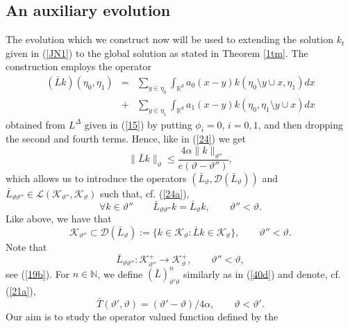 \documentclass[reqno,11pt]{amsart}
\theoremstyle{definition}
\theoremstyle{remark}
\numberwithin{equation}{section}
\begin{document}
\subsection{An auxiliary evolution}

The evolution which we construct now  will be used to extending the
solution $k_t$ given in (\ref{JN1}) to the global solution as stated
in Theorem \ref{1tm}. The construction employs the operator
\begin{eqnarray}
  \label{55}
(\bar{L} k) (\eta_0, \eta_1) & = & \sum_{y\in \eta_0}
\int_{\mathds{R}^d} a_0 (x-y) k(\eta_0 \setminus y \cup x, \eta_1) d
x \\[.2cm] & + & \sum_{y\in \eta_1}
\int_{\mathds{R}^d} a_1 (x-y) k(\eta_0, \eta_1 \setminus y \cup x) d
x  \nonumber
\end{eqnarray}
obtained from $L^\Delta$ given in (\ref{15}) by putting $\phi_i =0$,
$i=0,1$, and then dropping the second and fourth terms. Hence, like
in (\ref{24}) we get
\begin{equation}
  \label{56}
\| \bar{L}k\|_\vartheta \leq  \frac{4 \alpha \|k\|_{\vartheta''}}{
e(\vartheta - \vartheta'')},
\end{equation}
which allows us to introduce the operators $(\bar{L}_\vartheta,
\mathcal{D} (\bar{L}_\vartheta))$ and
$\bar{L}_{\vartheta\vartheta''}\in
\mathcal{L}(\mathcal{K}_{\vartheta''}, \mathcal{K}_{\vartheta})$
such that, cf. (\ref{24a}),
\begin{equation*}
  
\forall k \in \mathcal{\vartheta''} \qquad
\bar{L}_{\vartheta\vartheta''}k = \bar{L}_{\vartheta} k, \qquad
\vartheta'' < \vartheta.
\end{equation*}
Like above, we have that
\[
\mathcal{K}_{\vartheta''} \subset \mathcal{D}(\bar{L}_{\vartheta}):=
\{ k \in \mathcal{K}_{\vartheta} : \bar{L} k \in
\mathcal{K}_{\vartheta}\}, \qquad \vartheta'' < \vartheta  .
\]
Note that
\begin{equation}
  \label{58}
\bar{L}_{\vartheta\vartheta''} :\mathcal{K}_{\vartheta''}^+ \to
\mathcal{K}_{\vartheta}^+ , \qquad \vartheta'' < \vartheta,
\end{equation}
see (\ref{19b}).  For $n\in \mathds{N}$, we define
$(\bar{L})^n_{\vartheta'\vartheta}$ similarly as in (\ref{40d}) and
denote, cf. (\ref{21a}),
\begin{equation}
  \label{59}
\bar{T}(\vartheta', \vartheta) = (\vartheta' - \vartheta)/4 \alpha,
\qquad \vartheta < \vartheta' .
\end{equation}
Our aim is to study the operator valued function defined by the
\end{document}
